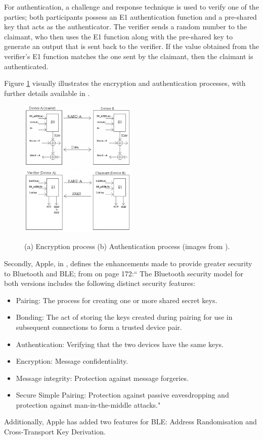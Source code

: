 \documentclass[english]{article}
\begin{document}
For authentication, a challenge and response technique is used to verify one of the parties; both participants possess an E1 authentication function and a pre-shared key that acts as the authenticator. The verifier sends a random number to the claimant, who then uses the E1 function along with the pre-shared key to generate an output that is sent back to the verifier. If the value obtained from the verifier's E1 function matches the one sent by the claimant, then the claimant is authenticated.

Figure \ref{blusec} visually illustrates the encryption and authentication processes, with further details available in \cite{1200664}.
\begin{figure}[]
	\centering
	\includegraphics[width=0.5\textwidth]{images/enc.png}\hfill 
	\includegraphics[width=0.5\textwidth]{images/auth.png}
	\caption{(a) Encryption process \quad (b) Authentication process (images from \cite{vainio2000bluetooth}).}
	\label{blusec}
\end{figure}

Secondly, Apple, in \cite{aps}, defines the enhancements made to provide greater security to Bluetooth and BLE; from \cite{aps} on page 172:`` The Bluetooth security model for both versions includes the following distinct security features:
\begin{itemize}
  \item Pairing: The process for creating one or more shared secret keys.
  \item Bonding: The act of storing the keys created during pairing for use in subsequent connections to form a trusted device pair.
  \item Authentication: Verifying that the two devices have the same keys.
  \item Encryption: Message confidentiality.
  \item Message integrity: Protection against message forgeries.
  \item Secure Simple Pairing: Protection against passive eavesdropping and protection against
  man-in-the-middle attacks."
\end{itemize}
Additionally, Apple has added two features for BLE: Address Randomisation and Cross-Transport Key Derivation.
\end{document}
